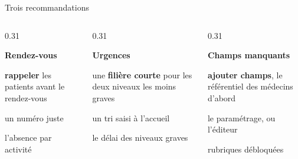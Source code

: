 \documentclass[aspectratio=169,11pt]{beamer}
\begin{document}
\begin{frame}{Trois recommandations}
  \vspace{2mm}
  \begin{columns}[T]
    \begin{column}{0.31\textwidth}
      {\large\bfseries\color{accentgarde}Rendez-vous\par}
      \medskip
      \textbf{rappeler} les patients avant le rendez-vous
      \bigskip

      \par un numéro juste
      \bigskip

      \par l'absence par activité
    \end{column}
    \begin{column}{0.31\textwidth}
      {\large\bfseries\color{accentgarde}Urgences\par}
      \medskip
      une \textbf{filière courte} pour les deux niveaux les moins graves
      \bigskip

      \par un tri saisi à l'accueil
      \bigskip

      \par le délai des niveaux graves
    \end{column}
    \begin{column}{0.31\textwidth}
      {\large\bfseries\color{accentgarde}Champs manquants\par}
      \medskip
      \textbf{ajouter  champs}, le référentiel des médecins d'abord
      \bigskip

      \par le paramétrage, ou l'éditeur
      \bigskip

      \par {} rubriques débloquées
    \end{column}
  \end{columns}
\end{frame}
\end{document}
